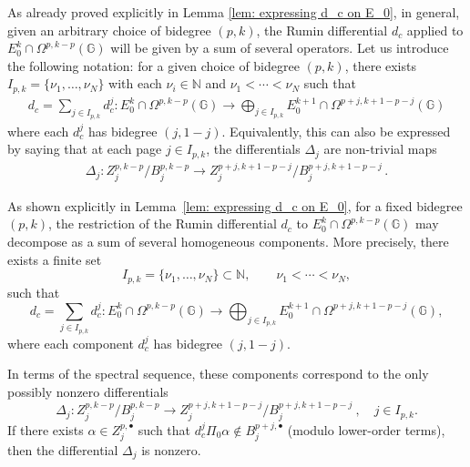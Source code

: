 \documentclass[dvipsnames]{amsart}
\theoremstyle{definition}
\theoremstyle{definition}
\numberwithin{equation}{section}
\newcommand{\N}{\mathbb{N}}
\newcommand{\G}{\mathbb{G}}
\begin{document}
As already proved explicitly in Lemma \ref{lem: expressing d_c on E_0}, in general, given an arbitrary choice of bidegree $(p,k)$, the Rumin differential $d_c$ applied to $E_0^k\cap\Omega^{p,k-p}(\G)$ will be given by a sum of several operators. Let us introduce the following notation: for a given choice of bidegree $(p,k)$, there exists $I_{p,k}=\{\nu_1,\ldots,\nu_N\}$ with each $\nu_i\in\N$ and $\nu_1<\cdots<\nu_N$ such that
\begin{align*}
    d_c=\sum_{j\in I_{p,k}}d_c^j\colon E_0^{k}\cap\Omega^{p,k-p}(\G)\longrightarrow\bigoplus_{j\in I_{p,k}}E_0^{k+1}\cap\Omega^{p+j,k+1-p-j}(\G)
\end{align*}
where each $d_c^j$ has bidegree $(j,1-j)$. Equivalently, this can also be expressed by saying that at each page $j\in I_{p,k}$, the differentials $\Delta_j$ are non-trivial maps
\begin{align*}
    \Delta_j\colon Z_j^{p,k-p}/B_j^{p,k-p}\longrightarrow Z_j^{p+j,k+1-p-j}/B_j^{p+j,k+1-p-j}\,.
\end{align*}

As shown explicitly in Lemma~\ref{lem: expressing d_c on E_0}, for a fixed bidegree $(p,k)$, the restriction of the Rumin differential $d_c$ to $E_0^k \cap \Omega^{p,k-p}(\mathbb{G})$
may decompose as a sum of several homogeneous components. More precisely, there exists a finite set
\[
I_{p,k}=\{\nu_1,\ldots,\nu_N\}\subset \mathbb{N},
\qquad \nu_1<\cdots<\nu_N,
\]
such that
\[
d_c
=
\sum_{j\in I_{p,k}} d_c^j
\colon
E_0^{k}\cap\Omega^{p,k-p}(\mathbb{G})
\longrightarrow
\bigoplus_{j\in I_{p,k}}
E_0^{k+1}\cap\Omega^{p+j,k+1-p-j}(\mathbb{G}),
\]
where each component $d_c^j$ has bidegree $(j,1-j)$.

In terms of the spectral sequence, these components correspond to the only possibly nonzero differentials
\[
\Delta_j
\colon
Z_j^{p,k-p}/B_j^{p,k-p}
\longrightarrow
Z_j^{p+j,k+1-p-j}/B_j^{p+j,k+1-p-j}\ ,
\quad j\in I_{p,k}.
\]
If there exists $\alpha \in Z_j^{p,\bullet}$ such that $d_c^j \Pi_0 \alpha \notin B_j^{p+j,\bullet}$ (modulo lower-order terms), then the differential $\Delta_j$ is nonzero.
\end{document}
